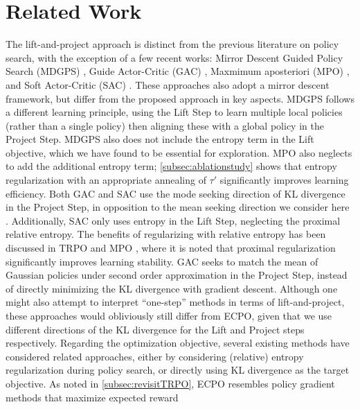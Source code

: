 
\section{Related Work}
\label{sec:related_work}

The lift-and-project approach is distinct from the previous literature on policy
search, with the exception of a few recent works:
Mirror Descent Guided Policy Search (MDGPS) \citep{montgomery2016guided},
Guide Actor-Critic (GAC) \citep{tangkaratt2017guide},
Maxmimum aposteriori (MPO) \citep{abdolmaleki2018maximum},
and Soft Actor-Critic (SAC) \citep{haarnoja2018soft}.
These approaches also adopt a mirror descent framework,
but differ from the proposed approach in key aspects.
%
MDGPS \citep{montgomery2016guided} follows a different learning principle,
using the Lift Step to learn multiple local policies 
(rather than a single policy)
then aligning these with a global policy in the Project Step.
MDGPS also does not include the entropy term in the Lift objective,
which we have found to be essential for exploration. 
%
MPO \citep{abdolmaleki2018maximum} also neglects to add the additional entropy 
term;
\cref{subsec:ablationstudy} shows that entropy regularization with an
appropriate annealing of $\tau'$ significantly improves learning efficiency.
%
Both GAC and SAC use the mode seeking direction of KL divergence in
the Project Step, in opposition to the mean seeking direction
we consider here \citep{tangkaratt2017guide,haarnoja2018soft}. 
Additionally, SAC only uses entropy
in the Lift Step, neglecting the proximal relative entropy.
The benefits of regularizing with relative entropy
has been discussed in TRPO \citep{schulman2015trust}
and MPO \citep{abdolmaleki2018maximum},
where it is noted that proximal regularization
significantly improves learning stability.
GAC seeks to match the mean of Gaussian policies under second order approximation in the Project Step,
instead of directly minimizing the KL divergence with gradient descent.
%
Although one might also attempt to interpret ``one-step'' methods
in terms of lift-and-project,
these approaches would obliviously still differ from ECPO,
given that we use different directions of the KL divergence
for the Lift and Project steps respectively. 
\if
Regarding the optimization objective,
several existing methods have considered related approaches,
either by considering (relative) entropy regularization during policy search,
or directly using KL divergence as the target objective. 
As noted in \cref{subsec:revisitTRPO},
ECPO resembles policy gradient methods that maximize expected reward
